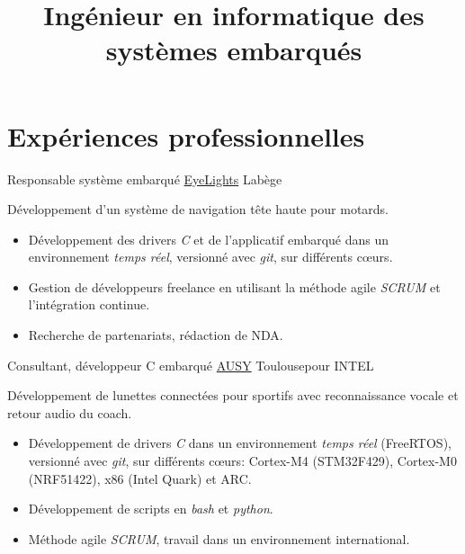 \documentclass[10pt,a4paper,sans]{moderncv}
\title{Ingénieur en informatique des systèmes embarqués} %
\begin{document}
\makecvtitle

\section{Expériences professionnelles}
	{Responsable système embarqué}
	{\href{https://www.eye-lights.com/}{EyeLights}}
	{Labège}{}
	{Développement d'un système de navigation tête haute pour motards.
\begin{addmargin}[1em]{1em}%
\begin{itemize}
\item Développement des drivers \emph{C} et de l'applicatif embarqué dans un environnement \emph{temps réel}, versionné avec \emph{git}, sur différents cœurs.
\item Gestion de développeurs freelance en utilisant la méthode agile \emph{SCRUM} et l'intégration continue.
\item Recherche de partenariats, rédaction de NDA.
\end{itemize}
\end{addmargin}
}

	{Consultant, développeur C embarqué}
	{\href{http://www.ausy.fr/}{AUSY}}
	{Toulouse}{pour INTEL}
	{Développement de lunettes connectées pour sportifs avec reconnaissance vocale et retour audio du coach.
\begin{addmargin}[1em]{1em}%
\begin{itemize}
\item Développement de drivers \emph{C} dans un environnement \emph{temps réel} (FreeRTOS), versionné avec \emph{git}, sur différents cœurs: Cortex-M4 (STM32F429), Cortex-M0 (NRF51422), x86 (Intel Quark) et ARC.
\item Développement de scripts en \emph{bash} et \emph{python}.
\item Méthode agile \emph{SCRUM}, travail dans un environnement international.
\end{itemize}
\end{addmargin}
}
\end{document}
